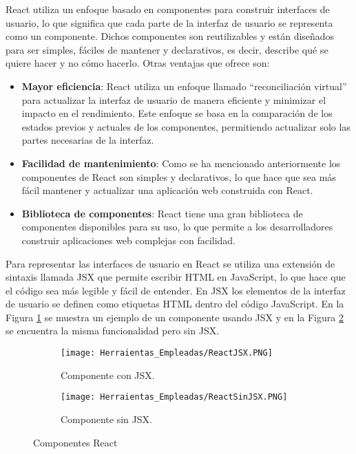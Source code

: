React utiliza un enfoque basado en componentes para construir interfaces de usuario, lo que significa que cada parte de la interfaz de usuario se representa como un componente. Dichos componentes son reutilizables y están diseñados para ser simples, fáciles de mantener y declarativos, es decir, describe qué se quiere hacer y no cómo hacerlo. Otras ventajas que ofrece son:

\begin{itemize}
  \item \textbf{Mayor eficiencia}: React utiliza un enfoque llamado ``reconciliación virtual'' para actualizar la interfaz de usuario de manera eficiente y minimizar el impacto en el rendimiento. Este enfoque se basa en la comparación de los estados previos y actuales de los componentes, permitiendo actualizar solo las partes necesarias de la interfaz.
  \item \textbf{Facilidad de mantenimiento}: Como se ha mencionado anteriormente los componentes de React son simples y declarativos, lo que hace que sea más fácil mantener y actualizar una aplicación web construida con React.
  \item \textbf{Biblioteca de componentes}: React tiene una gran biblioteca de componentes disponibles para su uso, lo que permite a los desarrolladores construir aplicaciones web complejas con facilidad.
\end{itemize}

Para representar las interfaces de usuario en React se utiliza una extensión de sintaxis llamada JSX que permite escribir HTML en JavaScript, lo que hace que el código sea más legible y fácil de entender. En JSX los elementos de la interfaz de usuario se definen como etiquetas HTML dentro del código JavaScript. En la Figura \ref{JSX} se muestra un ejemplo de un componente usando JSX y en la Figura \ref{SJSX} se encuentra la misma funcionalidad pero sin JSX.

\begin{figure}[ht!]

  \begin{subfigure}{\textwidth}
    \centering
    \texttt{[image: Herraientas\_Empleadas/ReactJSX.PNG]}
    \caption{Componente con JSX.}
    \label{JSX}
  \end{subfigure}

  \begin{subfigure}{\textwidth}
    \centering
    \texttt{[image: Herraientas\_Empleadas/ReactSinJSX.PNG]}
    \caption{Componente sin JSX.}
    \label{SJSX}
  \end{subfigure}
  \caption{Componentes React}
  \label{fig:react}
\end{figure}

